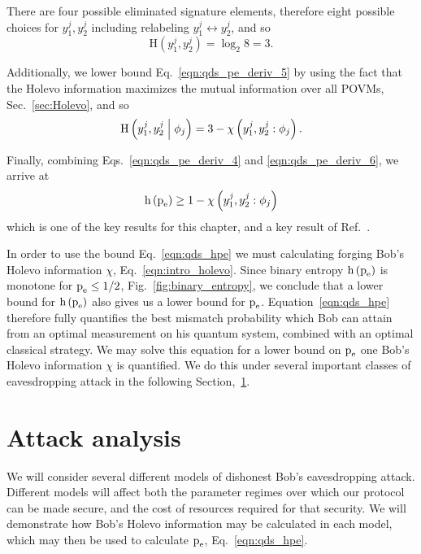\noindent There are four possible eliminated signature elements, therefore eight possible choices for $y_1^j, y_2^j$ including relabeling $y_1^j \leftrightarrow y_2^j$, and so 
\begin{equation}
\text{H}\left(y_1^j, y_2^j\right) = \log_2 8 = 3.
\end{equation}

\noindent Additionally, we lower bound Eq.~\ref{eqn:qds_pe_deriv_5} by using the fact that the Holevo information maximizes the mutual information over all POVMs, Sec.~\ref{sec:Holevo}, and so
\begin{equation}\label{eqn:qds_pe_deriv_6}
\text{H}\left(y_1^j, y_2^j \; \middle| \; \phi_j \right) = 3 - \chi\left(y_1^j, y_2^j : \phi_j\right).
\end{equation}

\noindent Finally, combining Eqs.~\ref{eqn:qds_pe_deriv_4} and \ref{eqn:qds_pe_deriv_6}, we arrive at
\begin{equation}\label{eqn:qds_hpe}
\text{h}\left(\text{p}_{\text{e}}\right) \ge 1 - \chi \left(y_1^j, y_2^j : \phi_j\right)
\end{equation}
which is one of the key results for this chapter, and a key result of Ref.~\cite{Thornton2019}. %

In order to use the bound Eq.~\ref{eqn:qds_hpe} we must calculating forging Bob's Holevo information $\chi$, Eq.~\ref{eqn:intro_holevo}. Since binary entropy $\text{h}\left(\text{p}_{\text{e}}\right)$ is monotone for $\text{p}_{\text{e}} \le 1/2$, Fig.~\ref{fig:binary_entropy}, we conclude that a lower bound for $\text{h}\left(\text{p}_{\text{e}}\right)$ also gives us a lower bound for $\text{p}_{\text{e}}$. Equation~\ref{eqn:qds_hpe} therefore fully quantifies the best mismatch probability which Bob can attain from an optimal measurement on his quantum system, combined with an optimal classical strategy. We may solve this equation for a lower bound on $\text{p}_{\text{e}}$ one Bob's Holevo information $\chi$ is quantified. We do this under several important classes of eavesdropping attack in the following Section,~\ref{sec:qds_attack_analysis}.


\section{Attack analysis}\label{sec:qds_attack_analysis}
We will consider several different models of dishonest Bob's eavesdropping attack. Different models will affect both the parameter regimes over which our protocol can be made secure, and the cost of resources required for that security. We will demonstrate how Bob's Holevo information may be calculated in each model, which may then be used to calculate $\text{p}_{\text{e}}$, Eq.~\ref{eqn:qds_hpe}.

